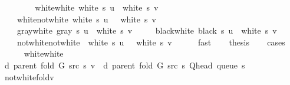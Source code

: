 \begin{isabellebody}
%
\isadelimvisible
%
\endisadelimvisible
%
\isatagvisible
{}\isamarkupfalse%
\ {\isacharminus}{\kern0pt}\isanewline
\ \ \isamarkupfalse%
\isanewline
\ \ \ \ {\isacharparenleft}{\kern0pt}white{\isacharunderscore}{\kern0pt}white{\isacharparenright}{\kern0pt}\ {\isachardoublequoteopen}white\ s\ u\ {\isasymand}\ white\ s\ v{\isachardoublequoteclose}\ {\isacharbar}{\kern0pt}\isanewline
\ \ \ \ {\isacharparenleft}{\kern0pt}white{\isacharunderscore}{\kern0pt}not{\isacharunderscore}{\kern0pt}white{\isacharparenright}{\kern0pt}\ {\isachardoublequoteopen}white\ s\ u\ {\isasymand}\ {\isasymnot}\ white\ s\ v{\isachardoublequoteclose}\ {\isacharbar}{\kern0pt}\isanewline
\ \ \ \ {\isacharparenleft}{\kern0pt}gray{\isacharunderscore}{\kern0pt}white{\isacharparenright}{\kern0pt}\ {\isachardoublequoteopen}gray\ s\ u\ {\isasymand}\ white\ s\ v{\isachardoublequoteclose}\ {\isacharbar}{\kern0pt}\isanewline
\ \ \ \ {\isacharparenleft}{\kern0pt}black{\isacharunderscore}{\kern0pt}white{\isacharparenright}{\kern0pt}\ {\isachardoublequoteopen}black\ s\ u\ {\isasymand}\ white\ s\ v{\isachardoublequoteclose}\ {\isacharbar}{\kern0pt}\isanewline
\ \ \ \ {\isacharparenleft}{\kern0pt}not{\isacharunderscore}{\kern0pt}white{\isacharunderscore}{\kern0pt}not{\isacharunderscore}{\kern0pt}white{\isacharparenright}{\kern0pt}\ {\isachardoublequoteopen}{\isasymnot}\ white\ s\ u\ {\isasymand}\ {\isasymnot}\ white\ s\ v{\isachardoublequoteclose}\isanewline
\ \ \ \ \isamarkupfalse%
\ fast\isanewline
\ \ \isamarkupfalse%
\ {\isacharquery}{\kern0pt}thesis\isanewline
\ \ \isamarkupfalse%
\ {\isacharparenleft}{\kern0pt}cases{\isacharparenright}{\kern0pt}\isanewline
\ \ \ \ \isamarkupfalse%
\ white{\isacharunderscore}{\kern0pt}white\isanewline
\ \ \ \ \isamarkupfalse%
\ {\isachardoublequoteopen}d\ {\isacharparenleft}{\kern0pt}parent\ {\isacharparenleft}{\kern0pt}fold\ G\ src\ s{\isacharparenright}{\kern0pt}{\isacharparenright}{\kern0pt}\ v\ {\isacharequal}{\kern0pt}\ d\ {\isacharparenleft}{\kern0pt}parent\ {\isacharparenleft}{\kern0pt}fold\ G\ src\ s{\isacharparenright}{\kern0pt}{\isacharparenright}{\kern0pt}\ {\isacharparenleft}{\kern0pt}Q{\isacharunderscore}{\kern0pt}head\ {\isacharparenleft}{\kern0pt}queue\ s{\isacharparenright}{\kern0pt}{\isacharparenright}{\kern0pt}\ {\isacharplus}{\kern0pt}\ {}{\isachardoublequoteclose}\isanewline
\ \ \ \ \ \ \isamarkupfalse%
\ not{\isacharunderscore}{\kern0pt}white{\isacharunderscore}{\kern0pt}fold{\isacharunderscore}{\kern0pt}v\isanewline

\end{isabellebody}
